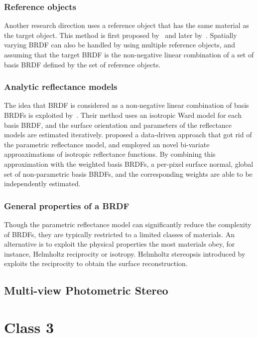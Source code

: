 \subsubsection{Reference objects}
Another research direction uses a reference object that has the same material as the target object. This method is first proposed by~\citeauthor{silver1980determining} and later by~\citeauthor{hertzmann2005example}. Spatially varying BRDF can also be handled by using multiple reference objects, and assuming that the target BRDF is the non-negative linear combination of a set of basis BRDF defined by the set of reference objects.

\subsubsection{Analytic reflectance models}
The idea that BRDF is considered as a non-negative linear combination of basis BRDFs is exploited by~\citeauthor{goldman2010shape}. Their method uses an isotropic Ward model for each basis BRDF, and the surface orientation and parameters of the reflectance models are estimated iteratively. \citeauthor{alldrin2008photometric} proposed a data-driven approach that got rid of the parametric reflectance model, and employed an novel bi-variate approaximations of isotropic reflectance functions. By combining this approximation with the weighted basis BRDFs, a per-pixel surface normal, global set of non-parametric basis BRDFs, and the corresponding weights are able to be independently estimated.

\subsubsection{General properties of a BRDF}
Though the parametric reflectance model can significantly reduce the complexity of BRDFs, they are typically restricted to a limited classes of materials. An alternative is to exploit the physical properties the most materials obey, for instance, Helmholtz reciprocity or isotropy. Helmholtz stereopsis introduced by~\citeauthor{zickler2002helmholtz} exploits the reciprocity to obtain the surface reconstruction.

\subsection{Multi-view Photometric Stereo}


\section{Class 3}
